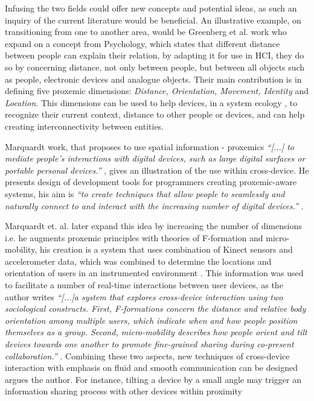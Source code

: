 Infusing the two fields could offer new concepts and potential ideas, as such an inquiry of the current literature would be beneficial. 
An illustrative example, on transitioning from one to another area, would be Greenberg et al. work \cite{Greenberg:2011} who expand on a concept from Psychology, which states that different distance between people can explain their relation, by adapting it for use in HCI, they do so by concerning distance, not only between people, but between all objects such as people, electronic devices and analogue objects. Their main contribution is in defining five proxemic dimensions: \emph{Distance, Orientation, Movement, Identity} and \emph{Location}. This dimensions can be used to help devices, in a system ecology , to recognize their current context, distance to other people or devices, and can help creating interconnectivity between entities. 

Marquardt work, that proposes to use spatial information - proxemics {\em``[...] to mediate people's interactions with digital devices, such as large digital surfaces or portable personal devices.''} \cite{Marquardt:2011}, gives an illustration of the use within cross-device. He presents design of development tools for programmers creating proxemic-aware systems, his aim is {\em``to create techniques that allow people to seamlessly and naturally connect to and interact with the increasing number of digital devices.''} \cite{Marquardt:2011}. 


Marquardt et. al.\cite{Marquardt:2012} later expand this idea by increasing the number of dimensions i.e. he augments proxemic principles with theories of F-formation and micro-mobility, his creation is a system that uses combination of Kinect sensors and accelerometer data, which was combined to determine the locations and orientation of users in an instrumented environment . This information was used to facilitate a number of real-time interactions between user devices, as the author writes {\em``[...]a system that explores cross-device interaction using two sociological constructs. First, F-formations concern the distance and relative body orientation among multiple users, which indicate when and how people position themselves as a group. Second, micro-mobility describes how people orient and tilt devices towards one another to promote fine-grained sharing during co-present collaboration.''} \cite{Marquardt:2012}. Combining these two aspects, new techniques of cross-device interaction with emphasis on fluid and smooth communication can be designed argues the author. For instance, tilting a device by a small angle may trigger an information sharing process with other devices within proximity\\ 


